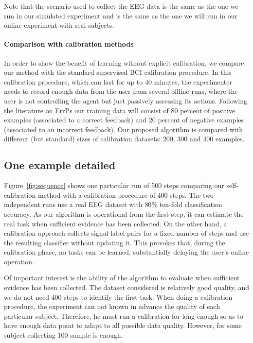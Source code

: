 Note that the scenario used to collect the EEG data is the same as the one we run in our simulated experiment and is the same as the one we will run in our online experiment with real subjects.

\paragraph{Comparison with calibration methods} In order to show the benefit of learning without explicit calibration, we compare our method with the standard supervised BCI calibration procedure. In this calibration procedure, which can last for up to 40 minutes, the experimenter needs to record enough data from the user from several offline runs, where the user is not controlling the agent but just passively assessing its actions. Following the literature on ErrPs \cite{chavarriaga2010learning,iturrate2013task} our training data will consist of 80 percent of positive examples (associated to a correct feedback) and 20 percent of negative examples (associated to an incorrect feedback). Our proposed algorithm is compared with different (but standard) sizes of calibration datasets: 200, 300 and 400 examples.

\subsection{One example detailed}

Figure~\ref{fig:sequence} shows one particular run of 500 steps comparing our self-calibration method with a calibration procedure of 400 steps. The two independent runs use a real EEG dataset with $80\%$ ten-fold classification accuracy. As our algorithm is operational from the first step, it can estimate the real task when sufficient evidence has been collected. On the other hand, a calibration approach collects signal-label pairs for a fixed number of steps and use the resulting classifier without updating it. This provokes that, during the calibration phase, no tasks can be learned, substantially delaying the user's online operation. 

Of important interest is the ability of the algorithm to evaluate when sufficient evidence has been collected. The dataset considered is relatively good quality, and we do not need 400 steps to identify the first task. When doing a calibration procedure, the experiment can not known in advance the quality of each particular subject. Therefore, he must run a calibration for long enough so as to have enough data point to adapt to all possible data quality. However, for some subject collecting 100 sample is enough.

